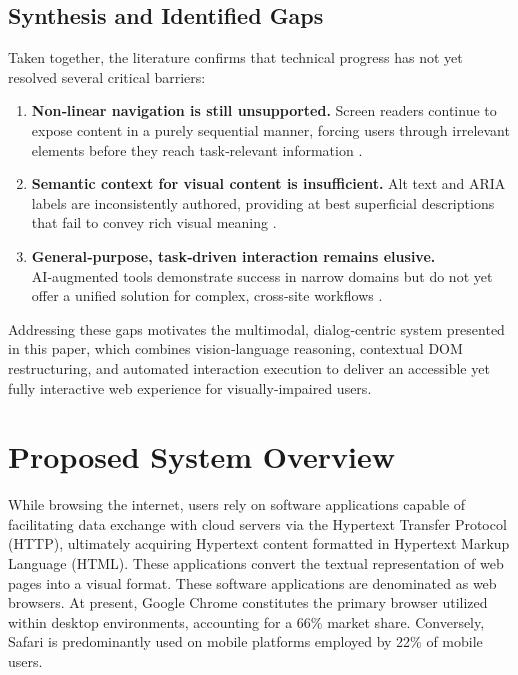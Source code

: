 \documentclass[conference]{IEEEtran}
\begin{document}
\subsection*{Synthesis and Identified Gaps}

Taken together, the literature confirms that technical progress has not yet resolved several critical barriers:

\begin{enumerate}
\item \textbf{Non‑linear navigation is still unsupported.} Screen readers continue to expose content in a purely sequential manner, forcing users through irrelevant elements before they reach task‑relevant information \cite{kerdar2024,wcagchallenges2025}.  
\item \textbf{Semantic context for visual content is insufficient.} Alt text and ARIA labels are inconsistently authored, providing at best superficial descriptions that fail to convey rich visual meaning \cite{wcag2023,wcagchallenges2025}.  
\item \textbf{General‑purpose, task‑driven interaction remains elusive.} AI‑augmented tools demonstrate success in narrow domains but do not yet offer a unified solution for complex, cross‑site workflows \cite{prakash2024,kodandaram2024,mehendale2024}.  
\end{enumerate}

Addressing these gaps motivates the multimodal, dialog‑centric system presented in this paper, which combines vision‑language reasoning, contextual DOM restructuring, and automated interaction execution to deliver an accessible yet fully interactive web experience for visually‑impaired users.



\section{Proposed System Overview}\label{system}

While browsing the internet, users rely on software applications capable of facilitating data exchange with cloud servers via the Hypertext Transfer Protocol (HTTP), ultimately acquiring Hypertext content formatted in Hypertext Markup Language (HTML). These applications convert the textual representation of web pages into a visual format. These software applications are denominated as web browsers. At present, Google Chrome constitutes the primary browser utilized within desktop environments, accounting for a 66\% \cite{browserstats2025} market share. Conversely, Safari is predominantly used on mobile platforms employed by 22\% \cite{browserstats2025} of mobile users.
\end{document}
